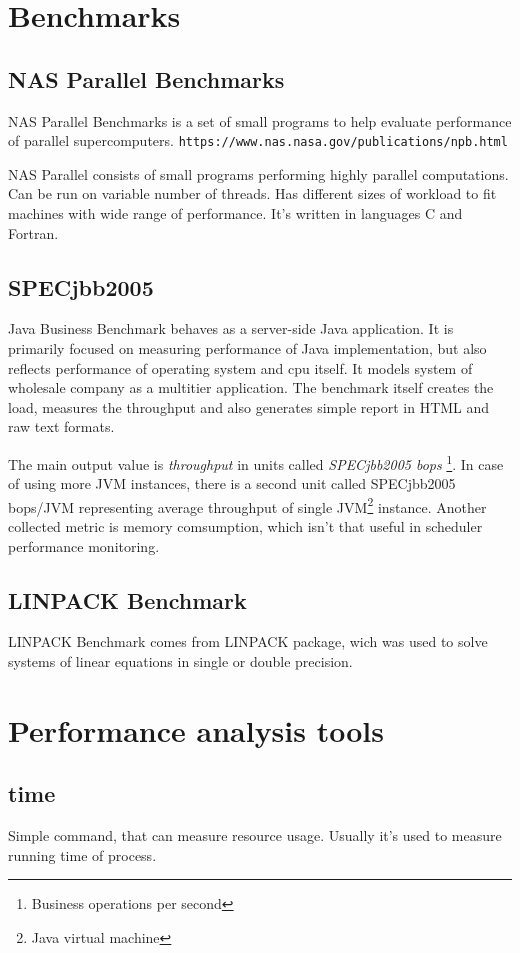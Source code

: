\section{Benchmarks}

\subsection{NAS Parallel Benchmarks}
NAS Parallel Benchmarks is a set of small programs to help evaluate performance of parallel supercomputers.
\texttt{https://www.nas.nasa.gov/publications/npb.html}

NAS Parallel consists of small programs performing highly parallel computations.
Can be run on variable number of threads. Has different sizes of workload to fit
machines with wide range of performance.
It's written in languages C and Fortran.

\subsection{SPECjbb2005}
Java Business Benchmark behaves as a server-side Java application. It is primarily focused on measuring performance of Java implementation, but also reflects performance of operating system and cpu itself.
It models system of wholesale company as a multitier application. The benchmark
itself creates the load, measures the throughput and also generates simple
report in HTML and raw text formats.

The main output value is \emph{throughput} in units called \emph{SPECjbb2005
  bops} \footnote{Business operations per second}.
In case of using more JVM instances, there is a second unit called SPECjbb2005
bops/JVM representing average throughput of single JVM\footnote{Java virtual machine} instance.
Another collected metric is memory comsumption, which isn't that useful in
scheduler performance monitoring.

\subsection{LINPACK Benchmark}
LINPACK Benchmark comes from LINPACK package, wich was used to solve systems of linear equations in single or double precision.

\section{Performance analysis tools}

\subsection{time}
Simple command, that can measure resource usage. Usually it's used to measure
running time of process.

